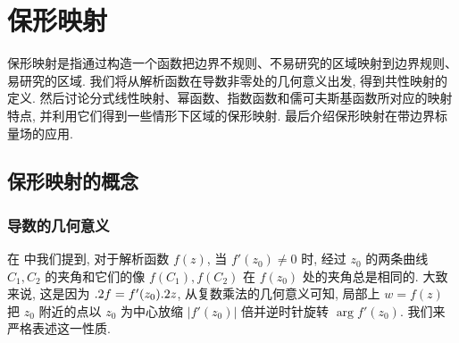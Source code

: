 \chapter{保形映射}
\label{chapter:6}

保形映射是指通过构造一个函数把边界不规则、不易研究的区域映射到边界规则、易研究的区域.
我们将从解析函数在导数非零处的几何意义出发, 得到共性映射的定义.
然后讨论分式线性映射、幂函数、指数函数和儒可夫斯基函数所对应的映射特点, 并利用它们得到一些情形下区域的保形映射.
最后介绍保形映射在带边界标量场的应用.



\section{保形映射的概念}

\subsection{导数的几何意义}


在 中我们提到, 对于解析函数 $f(z)$, 当 $f'(z_0)\neq 0$ 时, 经过 $z_0$ 的两条曲线 $C_1,C_2$ 的夹角和它们的像 $f(C_1),f(C_2)$ 在 $f(z_0)$ 处的夹角总是相同的.
大致来说, 这是因为 $.2 f=f'(z_0).2 z$, 从复数乘法的几何意义可知, 局部上 $w=f(z)$ 把 $z_0$ 附近的点以 $z_0$ 为中心放缩 $|f'(z_0)|$ 倍并逆时针旋转 $\arg{f'(z_0)}$.
我们来严格表述这一性质.

